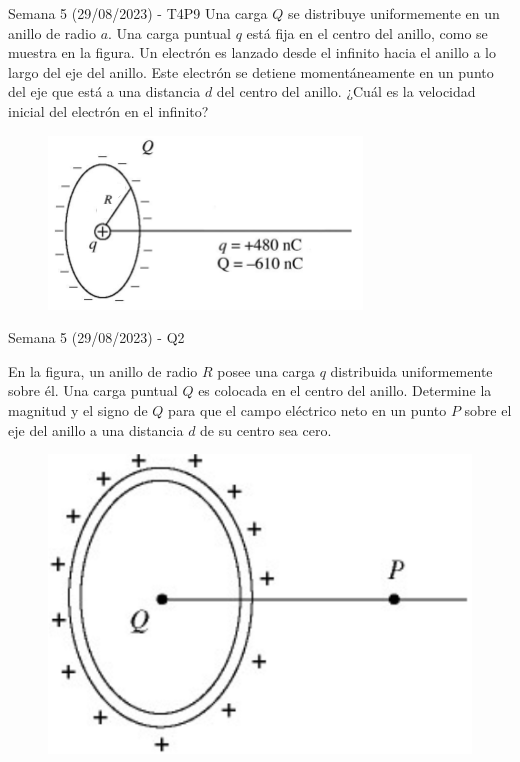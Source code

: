 \begin{frame}{Semana 5 (29/08/2023) - T4P9}
    Una carga $Q$ se distribuye uniformemente en un anillo de radio $a$. Una carga puntual $q$ está fija en el centro del anillo, como se muestra en la figura. Un electrón es lanzado desde el infinito hacia el anillo a lo largo del eje del anillo. Este electrón se detiene momentáneamente en un punto del eje que está a una distancia $d$ del centro del anillo. ¿Cuál es la velocidad inicial del electrón en el infinito?
    
    \begin{figure}
        \centering
        \includegraphics[scale=0.6]{figures/Q4.png}
    \end{figure}
    
\end{frame}

\begin{frame}{Semana 5 (29/08/2023) - Q2}

    En la figura, un anillo de radio $R$ posee una carga $q$ distribuida uniformemente sobre él. Una carga puntual $Q$ es colocada en el centro del anillo.
    Determine la magnitud y el signo de $Q$ para que el campo eléctrico neto en un punto $P$ sobre el eje del anillo a una distancia $d$ de su centro sea cero.
    
    \begin{figure}
        \centering
        \includegraphics[scale=0.3]{figures/problem-12.png}
    \end{figure}
    
\end{frame}

